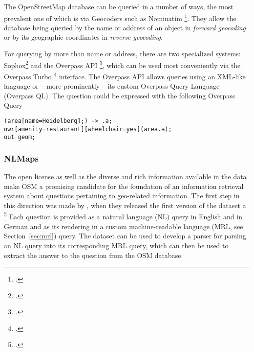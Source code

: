 The OpenStreetMap database can be queried in a number of ways, the most
prevalent one of which is via Geocoders such as Nominatim \footcite{nominatim}.
They allow the database being queried by the name or address of an object in
\emph{forward geocoding} or by its geographic coordinates in \emph{reverse
  geocoding}.

For querying by more than name or address, there are two specialized systems:
Sophox\footcite[The official website at \url{https://sophox.org} is offline as
of December 2020]{sophox} and the Overpass API \footcite{overpass-api}, which
can be used most conveniently via the Overpass Turbo \footcite{overpass-turbo}
interface. The Overpass API allows queries using an XML-like language or – more
prominently – its custom Overpass Query Language (Overpass QL). The question
 could be
expressed with the following Overpass Query

\begin{lstlisting}[style=MyOverpassQL,title={Overpass QL for wheelchair-accessible restaurants in Heidelberg}]
(area[name=Heidelberg];) -> .a;
nwr[amenity=restaurant][wheelchair=yes](area.a);
out geom;
\end{lstlisting}

\subsubsection{NLMaps}
\label{sec:nlmaps}

The open license as well as the diverse and rich information available in the
data make OSM a promising candidate for the foundation of an information
retrieval system about questions pertaining to geo-related information. The
first step in this direction was made by \textcite{haas-2016}, when they
released the first version of the \nlmaps{} dataset a \footcite{nlmaps} Each question is provided as
a natural language (NL) query in English and in German and as its rendering in a
custom machine-readable language (MRL, see Section~\ref{sec:mrl}) query. The
dataset can be used to develop a parser for parsing an NL query into its
corresponding MRL query, which can then be used to extract the answer to the
question from the OSM database.

